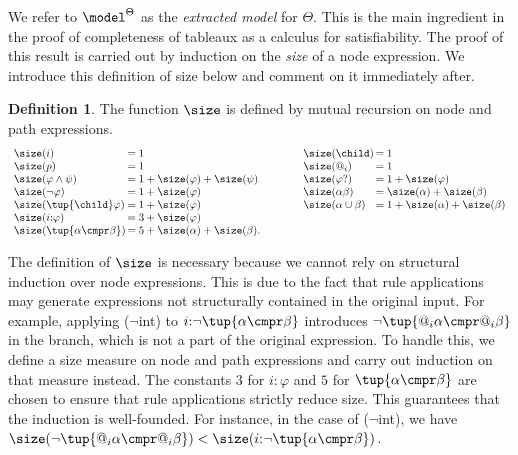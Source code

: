 \documentclass[10pt,a4paper]{amsart}
\theoremstyle{definition}
\newtheorem{defi}[thm]{Definition}
\theoremstyle{remark}
\begin{document}
We refer to $\model^{\Theta}$ as the \emph{extracted model} for $\Theta$.
This is the main ingredient in the proof of completeness of tableaux as a calculus for satisfiability.
The proof of this result is carried out by induction on the \emph{size} of a node expression. 
We introduce this definition of size below and comment on it immediately after. 

\begin{defi}\label{def:size}
    The function $\size$ is defined by mutual recursion on node and path expressions.
    \[\begin{array}{l@{\,}l@{\qquad}@{\qquad}l@{\,}l}
        \size(i) & = 1 & %
        \size(\child ) & = 1 \\ %
        \size(p) & = 1 & %
        \size(@_i) & = 1 \\ %
        \size(\varphi \land \psi) & = 1 + \size(\varphi) + \size(\psi) &
        \size(\varphi?) & = 1 + \size(\varphi) \\
        \size(\lnot \varphi) & = 1 + \size(\varphi) &
        \size( \alpha \beta ) & = \size(\alpha) + \size(\beta) \\
        \size(\tup{\child} \varphi) & = 1 + \size(\varphi) &
        \size( \alpha \cup \beta ) & = 1 + \size(\alpha) + \size(\beta) \\
        \size(i{:}\varphi) & = 3 + \size(\varphi) \\
        \size(\tup{\alpha \cmpr \beta}) & = 5 + \size(\alpha) + \size(\beta).
    \end{array}\]   
\end{defi}

The definition of $\size$ is necessary because we cannot rely on structural induction over node expressions. This is due to the fact that rule applications may generate expressions not structurally contained in the original input. For example, applying ($\lnot$int) to $i{:}\lnot\tup{\alpha \cmpr \beta}$ introduces $\lnot\tup{@_i\alpha \cmpr @_i\beta}$ in the branch, which is not a part of the original expression.
To handle this, we define a size measure on node and path expressions and carry out induction on that measure instead. The constants $3$ for $i{:}\varphi$ and $5$ for $\tup{\alpha \cmpr \beta}$ are chosen to ensure that rule applications strictly reduce size. This guarantees that the induction is well-founded. For instance, in the case of ($\lnot$int), we have $\size(\lnot\tup{@_i\alpha \cmpr @_i\beta}) < \size(i{:}\lnot\tup{\alpha \cmpr \beta})$.
\end{document}
